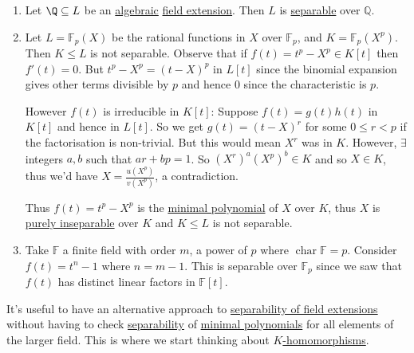 \documentclass{article}
\DeclareMathOperator{\chara}{char}
\newcommand{\F}{\mathbb{F}}
\begin{document}
\begin{eg}
    \leavevmode
    \begin{enumerate}[label=(\arabic*)]
        \item Let $\Q \subseteq L$ be an \hyperlink{def:algebraic}{algebraic} \hyperlink{def:fieldExt}{field extension}. Then $L$ is \hyperlink{def:separablePoly}{separable} over $\mathbb{Q}$.
        \item Let $L = \F_p(X)$ be the rational functions in $X$ over $\F_p$, and $K = \F_p(X^p)$.
            Then $K \leq L$ is not separable.
            Observe that if $f(t) = t^p - X^p \in K[t]$ then $f'(t) = 0$.
            But $t^p - X^p = (t-X)^p$ in $L[t]$ since the binomial expansion gives other terms divisible by $p$ and hence $0$ since the characteristic is $p$.

            However $f(t)$ is irreducible in $K[t]$:
            Suppose $f(t) = g(t) h(t)$ in $K[t]$ and hence in $L[t]$. So we get $g(t) = (t-X)^r$ for some $0 \leq r < p$ if the factorisation is non-trivial.
            But this would mean $X^r$ was in $K$. However, $\exists$integers $a, b$ such that $ar + bp = 1$.
            So $(X^r)^a (X^p)^b \in K$ and so $X \in K$, thus we'd have $X = \frac{u(X^p)}{v(X^p)}$, a contradiction.

            Thus $f(t) = t^p - X^p$ is the \hyperlink{def:minimalPoly}{minimal polynomial} of $X$ over $K$, thus $X$ is \hyperlink{def:separableExt}{purely inseparable} over $K$ and $K \leq L$ is not separable.
        \item Take $\F$ a finite field with order $m$, a power of $p$ where $\chara \F = p$. Consider $f(t) = t^n - 1$ where $n = m-1$. This is separable over $\F_p$ since we saw that $f(t)$ has distinct linear factors in $\F[t]$.
    \end{enumerate}
\end{eg}

\begin{remark}
    It's useful to have an alternative approach to \hyperlink{def:separableExt}{separability of field extensions} without having to check \hyperlink{def:separablePoly}{separability}
    of \hyperlink{def:minimalPoly}{minimal polynomials} for all elements of the larger field.
    This is where we start thinking about \hyperlink{def:homo}{$K$-homomorphisms}.
\end{remark}
\end{document}
